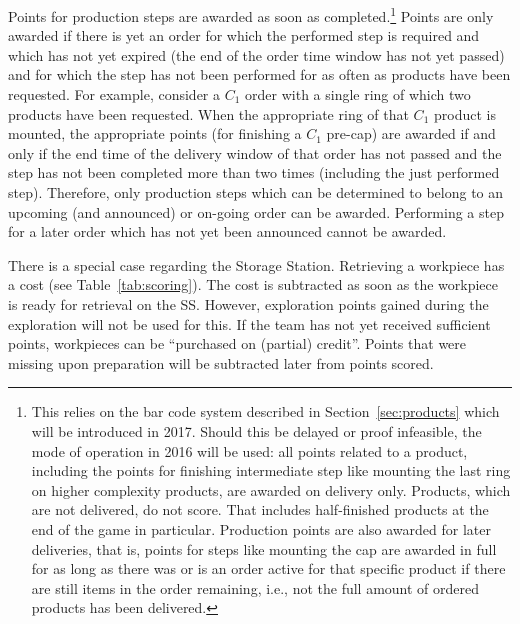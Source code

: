 \documentclass[12pt,twoside]{article}
\newcommand{\refsec}[1]{Section~\ref{#1}}
\newcommand{\reftab}[1]{Table~\ref{#1}}
\begin{document}
Points for production steps are awarded as soon as
completed.\footnote{This relies on the bar code system described in
  \refsec{sec:products} which will be introduced in 2017. Should this
  be delayed or proof infeasible, the mode of operation in 2016 will
  be used: all points related to a product, including the points for
  finishing intermediate step like mounting the last ring on higher
  complexity products, are awarded on delivery only. Products, which
  are not delivered, do not score. That includes half-finished
  products at the end of the game in particular. Production points are
  also awarded for later deliveries, that is, points for steps like
  mounting the cap are awarded in full for as long as there was or is
  an order active for that specific product if there are still items
  in the order remaining, i.e., not the full amount of ordered products
  has been delivered.}
%
Points are only awarded if there is yet an order for which the
performed step is required and which has not yet expired (the end of
the order time window has not yet passed) and for which the step has
not been performed for as often as products have been requested. For
example, consider a $C_1$ order with a single ring of which two
products have been requested. When the appropriate ring of that $C_1$
product is mounted, the appropriate points (for finishing a $C_1$
pre-cap) are awarded if and only if the end time of the delivery
window of that order has not passed and the step has not been
completed more than two times (including the just performed
step). Therefore, only production steps which can be determined to
belong to an upcoming (and announced) or on-going order can be
awarded. Performing a step for a later order which has not yet been
announced cannot be awarded.

There is a special case regarding the Storage Station. Retrieving a
workpiece has a cost (see \reftab{tab:scoring}). The cost is
subtracted as soon as the workpiece is ready for retrieval on the SS.
However, exploration points gained during the exploration will not be
used for this. If the team has not yet received sufficient points,
workpieces can be ``purchased on (partial) credit''. Points that were
missing upon preparation will be subtracted later from points scored.
\end{document}

